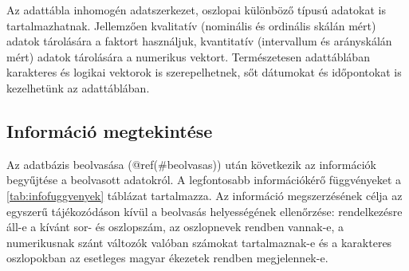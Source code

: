 \documentclass[
]{book}
\begin{document}
Az adattábla inhomogén adatszerkezet, oszlopai különböző típusú adatokat is tartalmazhatnak. Jellemzően kvalitatív (nominális és ordinális skálán mért) adatok tárolására a faktort használjuk, kvantitatív (intervallum és arányskálán mért) adatok tárolására a numerikus vektort. Természetesen adattáblában karakteres és logikai vektorok is szerepelhetnek, sőt dátumokat és időpontokat is kezelhetünk az adattáblában.

\hypertarget{informuxe1ciuxf3-megtekintuxe9se}{%
\subsection{Információ megtekintése}\label{informuxe1ciuxf3-megtekintuxe9se}}

Az adatbázis beolvasása (@ref(\#beolvasas)) után következik az információk begyűjtése a beolvasott adatokról. A legfontosabb információkérő függvényeket a \ref{tab:infofuggvenyek} táblázat tartalmazza. Az információ megszerzésének célja az egyszerű tájékozódáson kívül a beolvasás helyességének ellenőrzése: rendelkezésre áll-e a kívánt sor- és oszlopszám, az oszlopnevek rendben vannak-e, a numerikusnak szánt változók valóban számokat tartalmaznak-e és a karakteres oszlopokban az esetleges magyar ékezetek rendben megjelennek-e.
\end{document}
